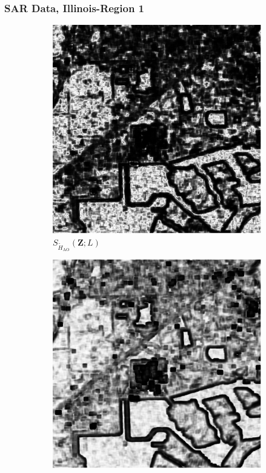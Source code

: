 \documentclass[aspectratio=1610,10pt]{beamer}
\begin{document}
\begin{frame} \frametitle{\large{SAR Data, Illinois-Region 1 }}\vspace{-0.1cm}
\begin{figure}[H]
  \centering
  \begin{subfigure}[b]{0.3\textwidth}
    \centering
    \includegraphics[width=\textwidth]{../../Figures/PNG/H_pvalue_lake_512_36L_AO_100b}
    \caption{$S_{\widetilde{H}_{\text{AO}}}(\bm{Z}; L)$}
    \label{fig:lake_pvalue-1}
  \end{subfigure}
  \hfill
  \begin{subfigure}[b]{0.3\textwidth}
    \centering
    \includegraphics[width=\textwidth]{../../Figures/PNG/cv_pvalues_lake_512}

\end{subfigure}
\end{figure}
\end{frame}
\end{document}
